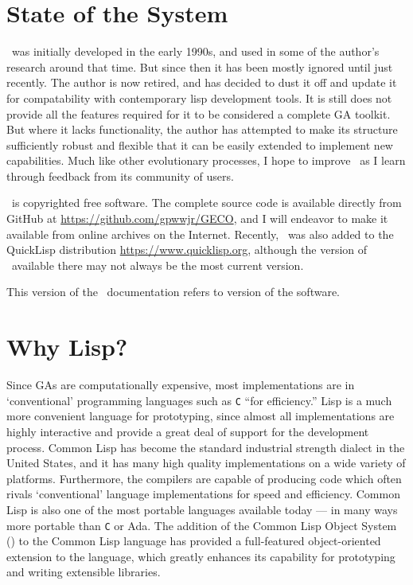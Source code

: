 \section{State of the System}

\Geco\ was initially developed in the early 1990s, and used in some of the author's
research around that time. But since then it has been mostly ignored
until just recently. The author is now retired, and
has decided to dust it off and update it for compatability with contemporary lisp
development tools.
It is still does not provide
all the features required for it to be considered a complete GA toolkit. But
where it lacks functionality, the author has attempted to make its structure sufficiently 
robust and flexible that it can be easily extended to implement new
capabilities. Much like other evolutionary
processes, I hope to improve \geco\ as I learn through feedback from its
community of users.

\Geco\ is copyrighted free software. The complete source code is available
directly from GitHub at \href{https://github.com/gpwwjr/GECO}
{https://github.com/gpwwjr/GECO}, and I will endeavor
to make it available from online archives on
the Internet.
Recently, \geco\ was also added to the QuickLisp distribution
\href{https://www.quicklisp.org}{https://www.quicklisp.org}, although the
version of \geco\ available there may not always be the most current version.

This version of the \geco\ documentation refers to version
\gecoversion{} of the software.

\section{Why Lisp?}

Since GAs are computationally expensive, most implementations are in
`conventional' programming languages such as {\tt C} ``for efficiency.'' Lisp is
a much more convenient language for prototyping, since almost all
implementations are highly interactive and provide a great deal of support for
the development process. Common Lisp has become the standard industrial
strength dialect in the United States, and it has many high quality
implementations on a wide variety of platforms. Furthermore, the compilers are
capable of producing code which often rivals `conventional' language
implementations for speed and efficiency. Common Lisp is also one of the most
portable languages available today --- in many ways more portable than {\tt C}
or Ada. The addition of the Common Lisp Object System
() to the Common Lisp language \cite{cl:steele2,cl:keene} has
provided a full-featured object-oriented extension to the language, which
greatly enhances its capability for prototyping and writing extensible
libraries.


